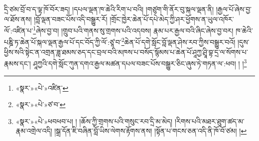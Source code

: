 དྲི་ཙམ་བྲོ་བ་ད་ལྟ་ཁོ་བོར་ཟད། །དཔལ་ལྡན་ཁ་ཆེའི་རིག་པ་བའི། །གཙུག་གི་ནོར་བུ་སྐལ་ལྡན་ནི། །རྒྱལ་པོ་ཞེས་བྱ་ལ་ཐོས་ནས། །བློ་ལྡན་བཟང་པོས་འདི་བསྒྱུར་རོ། །གྲོང་ཁྱེར་ཆེན་པོ་དཔེ་མེད་ཀྱི་ཤར་ཕྱོགས་ན་ཡུལ་འཁོར་ལོ་:འཛིན་པ་\footnote{«སྣར་»«པེ་»འཛིན་}ཞེས་བྱ་བ། །གྲུབ་པའི་གནས་སུ་གྲགས་པའི་འདབས། རྣམ་པར་རྒྱལ་བའི་ཞིང་ཞེས་བྱ་བར། ཁ་ཆེའི་པཎྜི་ཏ་ཆེན་པོ་སྐལ་ལྡན་རྒྱལ་པོ་དང་བོད་ཀྱི་ལོ་:ཙཱ་བ་\footnote{«སྣར་»«པེ་»ཙ་བ་}ཆེན་པོ་དགེ་སློང་བློ་ལྡན་ཤེས་རབ་ཀྱིས་བསྒྱུར་བའོ། །དུས་ཕྱིས་སའི་སྟེང་ན་འགྲན་ཟླ་ཐམས་ཅད་དང་བྲལ་བའི་མཁས་པ་བསོད་སྙོམས་པ་ཆེན་པོ་ཤཱཀྱ་ཤྲཱི་བྷ་དྲ་ལ་སོགས་པ་རྣམས་དང་། ཤཱཀྱའི་དགེ་སློང་ཀུན་དགའ་རྒྱལ་མཚན་དཔལ་བཟང་པོས་བསྒྱུར་ཅིང་ཞུས་ཏེ་གཏན་ལ་:ཕབ། ། །\footnote{«སྣར་»«པེ་»ཕབཕབ་པ། ། །ཆོས་ཀྱི་གྲགས་པའི་གསུང་རབ་དྲི་མ་མེད། །རིགས་པའི་མཐར་ཐུག་ཚད་མ་རྣམ་འགྲེལ་འདི། །སྒྲ་དོན་ཇི་བཞིན་བློ་ཡིས་ལེགས་རྟོགས་ནས། །སྟོན་པ་གངས་ཅན་འདི་ནི་ཁོ་བོ་ཙམ། །}